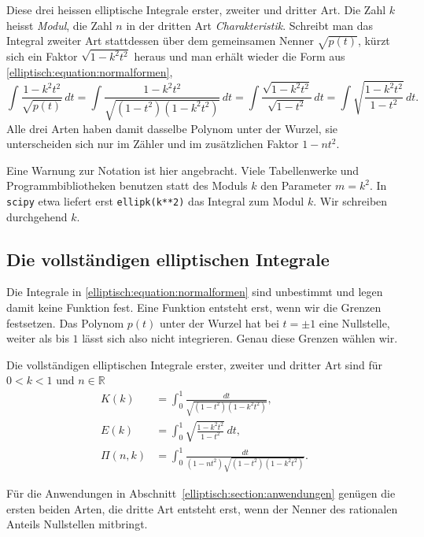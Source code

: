 Diese drei heissen elliptische Integrale erster, zweiter und
dritter Art.
Die Zahl $k$ heisst \emph{Modul}, die Zahl $n$ in der dritten Art
\emph{Charakteristik}.
%
%
Schreibt man das Integral zweiter Art stattdessen über dem
gemeinsamen Nenner $\sqrt{p(t)}$, kürzt sich ein Faktor
$\sqrt{1-k^2t^2}$ heraus und man erhält wieder die Form aus
\eqref{elliptisch:equation:normalformen},
\begin{equation}
\int \frac{1-k^2t^2}{\sqrt{p(t)}}\,dt
=
\int \frac{1-k^2t^2}{\sqrt{(1-t^2)(1-k^2t^2)}}\,dt
=
\int \frac{\sqrt{1-k^2t^2}}{\sqrt{1-t^2}}\,dt
=
\int \sqrt{\frac{1-k^2t^2}{1-t^2}}\,dt.
\label{elliptisch:equation:zweiteart}
\end{equation}
Alle drei Arten haben damit dasselbe Polynom unter der Wurzel, sie
unterscheiden sich nur im Zähler und im zusätzlichen Faktor
$1-nt^2$.

Eine Warnung zur Notation ist hier angebracht.
Viele Tabellenwerke und Programmbibliotheken benutzen statt des
Moduls $k$ den Parameter $m = k^2$.
In \texttt{scipy} etwa liefert erst \texttt{ellipk(k**2)} das
Integral zum Modul $k$.
Wir schreiben durchgehend $k$.

\subsection{Die vollständigen elliptischen Integrale}
Die Integrale in \eqref{elliptisch:equation:normalformen} sind
unbestimmt und legen damit keine Funktion fest.
Eine Funktion entsteht erst, wenn wir die Grenzen festsetzen.
Das Polynom $p(t)$ unter der Wurzel hat bei $t = \pm 1$ eine
Nullstelle, weiter als bis $1$ lässt sich also nicht integrieren.
Genau diese Grenzen wählen wir.
\begin{definition}
\label{elliptisch:definition:vollstaendig}
Die vollständigen elliptischen Integrale erster, zweiter und
dritter Art sind für $0 < k < 1$ und $n \in \mathbb{R}$
\begin{equation}
\begin{aligned}
K(k)
&=
\int_0^1 \frac{dt}{\sqrt{(1-t^2)(1-k^2t^2)}},
\\
E(k)
&=
\int_0^1 \sqrt{\frac{1-k^2t^2}{1-t^2}}\,dt,
\\
\Pi(n,k)
&=
\int_0^1 \frac{dt}{(1-nt^2)\sqrt{(1-t^2)(1-k^2t^2)}}.
\end{aligned}
\label{elliptisch:equation:vollstaendig}
\end{equation}
\end{definition}
%
%
%
Für die Anwendungen in
Abschnitt~\ref{elliptisch:section:anwendungen} genügen die ersten
beiden Arten, die dritte Art entsteht erst, wenn der Nenner des
rationalen Anteils Nullstellen mitbringt.


